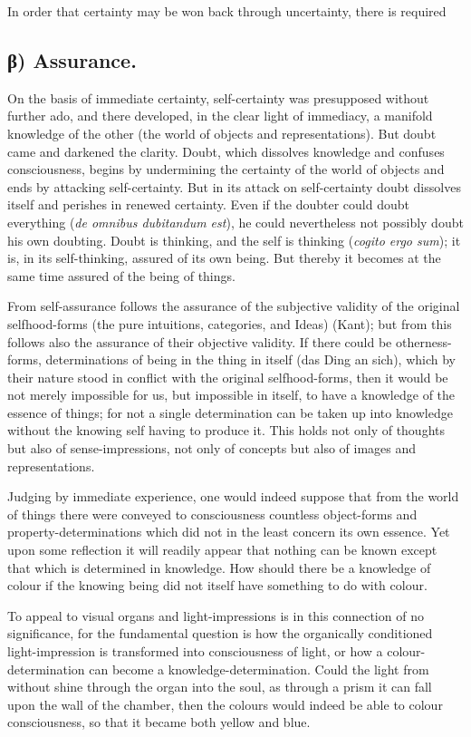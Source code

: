 \documentclass[12pt]{book}
\begin{document}
In order that certainty may be won back through uncertainty, there
is required

\subsection*{β) Assurance.}

On the basis of immediate certainty, self-certainty was presupposed
without further ado, and there developed, in the clear light of
immediacy, a manifold knowledge of the other (the world of objects
and representations). But doubt came and darkened the clarity.
Doubt, which dissolves knowledge and confuses consciousness, begins
by undermining the certainty of the world of objects and ends by
attacking self-certainty. But in its attack on self-certainty doubt
dissolves itself and perishes in renewed certainty. Even if the
doubter could doubt everything (\textit{de omnibus dubitandum est}),
he could nevertheless not possibly doubt his own doubting. Doubt is
thinking, and the self is thinking (\textit{cogito ergo sum}); it
is, in its self-thinking, assured of its own being. But thereby it
becomes at the same time assured of the being of things.

From self-assurance follows the assurance of the subjective validity
of the original selfhood-forms (the pure intuitions, categories, and
Ideas) (Kant); but from this follows also the assurance of their
objective validity. If
there could be otherness-forms, determinations of being in the thing
in itself (das Ding an sich), which by their nature stood in
conflict with the original selfhood-forms, then it would be not
merely impossible for us, but impossible in itself, to have a
knowledge of the essence of things; for not a single determination
can be taken up into knowledge without the knowing self having to
produce it. This holds not only of thoughts but also of
sense-impressions, not only of concepts but also of images and
representations.

Judging by immediate experience, one would indeed suppose that from
the world of things there were conveyed to consciousness countless
object-forms and property-determinations which did not in the least
concern its own essence. Yet upon some reflection it will readily
appear that nothing can be known except that which is determined in
knowledge. How should there be a knowledge of colour if the knowing
being did not itself have something to do with colour.

To appeal to visual organs and light-impressions is in this
connection of no significance, for the fundamental question is how
the organically conditioned light-impression is transformed into
consciousness of light, or how a colour-determination can become a
knowledge-determination. Could the light from without shine through
the organ into the soul, as through a prism it can fall upon the
wall of the chamber, then the colours would indeed be able to colour
consciousness, so that it became both yellow and blue.
\end{document}
